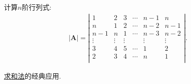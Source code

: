 \documentclass[../../main.tex]{subfiles}%
\begin{document}
\begin{example}
\begin{solution}
\end{solution}
\end{example}

\begin{example}
计算$n$阶行列式:
\begin{align*}
|\boldsymbol{A}|=\left| \begin{matrix}
1&		2&		3&		\cdots&		n-1&		n\\
n&		1&		2&		\cdots&		n-2&		n-1\\
n-1&		n&		1&		\cdots&		n-3&		n-2\\
\vdots&		\vdots&		\vdots&		&		\vdots&		\vdots\\
3&		4&		5&		\cdots&		1&		2\\
2&		3&		4&		\cdots&		n&		1\\
\end{matrix}\right|.
\end{align*}
\end{example}
\begin{note}
\hyperlink{行列式计算:求和法}{求和法}的经典应用.
\end{note}
\end{document}
